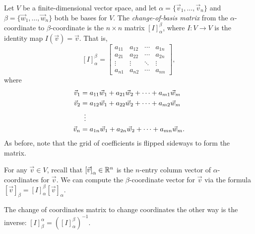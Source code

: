 \begin{definition}
	Let $V$ be a finite-dimensional vector space, and let $\alpha = \{\vec{v}_1,
	\dots, \vec{v}_n\}$ and $\beta = \{\vec{w}_1, \dots, \vec{w}_n\}$ both be
	bases for $V$. The \emph{change-of-basis matrix} from the $\alpha$-coordinate
	to $\beta$-coordinate is the $n \times n$ matrix ${[I]}_\alpha^\beta$, where
	$I: V \rightarrow V$ is the identity map $I(\vec{v}) = \vec{v}$. That is,
	\[
		{[I]}_\alpha^\beta =
		\begin{bmatrix}
			a_{11} & a_{12} & \cdots & a_{1n} \\
			a_{21} & a_{22} & \cdots & a_{2n} \\
			\vdots & \vdots & \ddots & \vdots \\
			a_{n1} & a_{n2} & \cdots & a_{nn}
		\end{bmatrix},
	\]
	where
	\begin{align*}
		\vec{v}_1 &= a_{11} \vec{w}_1 + a_{21} \vec{w}_2 + \cdots + a_{m1} \vec{w}_m
		\\
		\vec{v}_2 &= a_{12} \vec{w}_1 + a_{22} \vec{w}_2 + \cdots + a_{m2} \vec{w}_m
		\\
		&\vdotswithin{=} \\
		\vec{v}_n &= a_{1n} \vec{w}_1 + a_{2n} \vec{w}_2 + \cdots + a_{mn}
		\vec{w}_m.
	\end{align*}
	As before, note that the grid of coefficients is flipped sideways to form the
	matrix.
\end{definition}

\begin{fact}
	For any $\vec{v} \in V$, recall that ${[\vec{v}]}_\alpha \in {\mathbb{R}}^n$ is the
	$n$-entry column vector of $\alpha$-coordinates for $\vec{v}$. We can compute
	the $\beta$-coordinate vector for $\vec{v}$ via the formula ${[\vec{v}]}_\beta
	= {[I]}_\alpha^\beta {[\vec{v}]}_\alpha$.
\end{fact}

\begin{fact}
	The change of coordinates matrix to change coordinates the other way is the
	inverse: ${[I]}_\beta^\alpha = {({[I]}_\alpha^\beta)}^{-1}$.
\end{fact}
